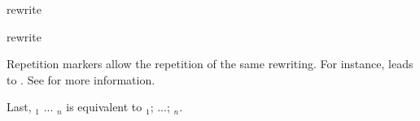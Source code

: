 \begin{tactic}{rewrite}
\begin{tsyntax}[empty]{rewrite}
    \medskip
    
    Repetition markers allow the repetition of the same rewriting. For instance,
     leads to . See  for
    more information.
    
    \medskip

    Last,  ${}_1$ ... ${}_n$ is equivalent to
     ${}_1$; ...;  ${}_n$.
  \end{tsyntax}
\end{tactic}
